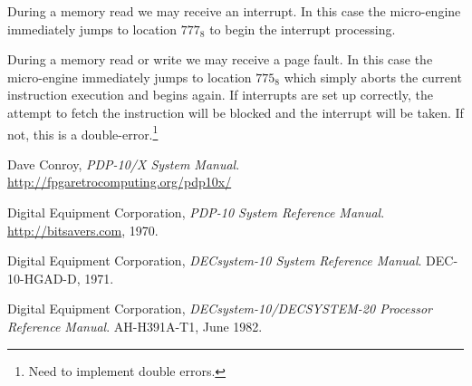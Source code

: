 \documentclass[12pt]{report}
\begin{document}
During a memory read we may receive an interrupt.  In this case the micro-engine immediately
jumps to location $777_8$ to begin the interrupt processing.

During a memory read or write we may receive a page fault.  In this case the micro-engine
immediately jumps to location $775_8$ which simply aborts the current instruction execution and
begins again.  If interrupts are set up correctly, the attempt to fetch the instruction will be
blocked and the interrupt will be taken.  If not, this is a double-error.\footnote{Need to
  implement double errors.}

\begin{thebibliography}{9}

  Dave Conroy,
  \emph{PDP-10/X System Manual}.
  \url{http://fpgaretrocomputing.org/pdp10x/}

  Digital Equipment Corporation,
  \emph{PDP-10 System Reference Manual}.
  \url{http://bitsavers.com},
  1970.

  Digital Equipment Corporation,
  \emph{DECsystem-10 System Reference Manual}.
  DEC-10-HGAD-D,
  1971.

  Digital Equipment Corporation,
  \emph{DECsystem-10/DECSYSTEM-20 Processor Reference Manual}.
  AH-H391A-T1,
  June 1982.

\end{thebibliography}
\end{document}
